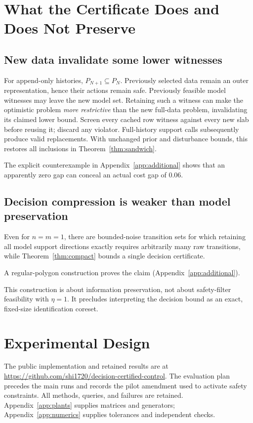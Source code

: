 \documentclass{l4dc2026}
\begin{document}
\section{What the Certificate Does and Does Not Preserve}
\subsection{New data invalidate some lower witnesses}
For append-only histories, $P_{N+1}\subseteq P_N$. Previously selected data remain an outer representation, hence their actions remain safe. Previously feasible model witnesses may leave the new model set. Retaining such a witness can make the optimistic problem \emph{more restrictive} than the new full-data problem, invalidating its claimed lower bound. Screen every cached row witness against every new slab before reusing it; discard any violator. Full-history support calls subsequently produce valid replacements. With unchanged prior and disturbance bounds, this restores all inclusions in Theorem~\ref{thm:sandwich}.

The explicit counterexample in Appendix~\ref{app:additional} shows that an apparently zero gap can conceal an actual cost gap of $0.06$.

\subsection{Decision compression is weaker than model preservation}
\begin{proposition}\label{prop:polygon}
Even for $n=m=1$, there are bounded-noise transition sets for which retaining all model support directions exactly requires arbitrarily many raw transitions, while Theorem~\ref{thm:compact} bounds a single decision certificate.
\end{proposition}
A regular-polygon construction proves the claim (Appendix~\ref{app:additional}).

This construction is about information preservation, not about safety-filter feasibility with $\eta=1$. It precludes interpreting the decision bound as an exact, fixed-size identification coreset.

\section{Experimental Design}\label{sec:experiments}
The public implementation and retained results are at \url{https://github.com/shi1720/decision-certified-control}. The evaluation plan precedes the main runs and records the pilot amendment used to activate safety constraints. All methods, queries, and failures are retained. Appendix~\ref{app:plants} supplies matrices and generators; Appendix~\ref{app:numerics} supplies tolerances and independent checks.
\end{document}
